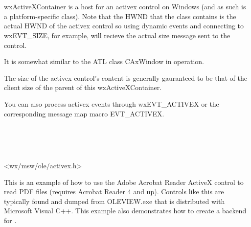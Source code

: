
\section{}\label{wxactivexcontainer}

wxActiveXContainer is a host for an activex control on Windows (and
as such is a platform-specific class). Note that the HWND that the class
contains is the actual HWND of the activex control so using dynamic events
and connecting to wxEVT\_SIZE, for example, will recieve the actual size
message sent to the control.

It is somewhat similar to the ATL class CAxWindow in operation.

The size of the activex control's content is generally gauranteed to be that
of the client size of the parent of this wxActiveXContainer.

You can also process activex events through wxEVT\_ACTIVEX or the
corresponding message map macro EVT\_ACTIVEX.




\\
\\
\\


<wx/msw/ole/activex.h>


This is an example of how to use the Adobe Acrobat Reader ActiveX control to read PDF files
(requires Acrobat Reader 4 and up). Controls like this are typically found and dumped from
OLEVIEW.exe that is distributed with Microsoft Visual C++. This example also demonstrates
how to create a backend for .

